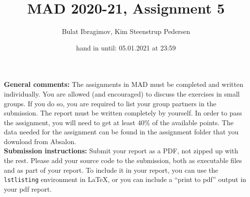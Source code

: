 \documentclass[a4paper,10pt]{article}
\title{MAD 2020-21, Assignment 5}
\author{Bulat Ibragimov, Kim Steenstrup Pedersen}
\date{hand in until: 05.01.2021 at 23:59\\
}
\begin{document}
\maketitle 


\noindent 
{\bf General comments:}
The assignments in MAD must be completed and written individually. You are allowed (and encouraged) to discuss the exercises in small groups. If you do so, you are required to list your group partners in the submission. The report must be written completely by yourself. %
In order to pass the assignment, you will need to get at least $40 \%$ of the available points. %
The data needed for the assignment can be found in the assignment folder that you download from Absalon.\\[2ex]
\noindent 
{\bf Submission instructions:}
Submit your report as a PDF, not zipped up with the rest. Please add your source code to the submission, both as executable files and as part of your report. To include it in your report, you can use the \texttt{lstlisting} environment in LaTeX, or you can include a ``print to pdf'' output in your pdf report. 


\noindent 
\hrulefill
\end{document}
